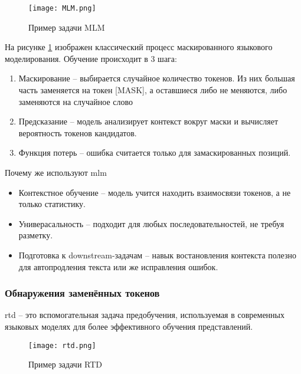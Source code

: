 \documentclass[../part_1.tex]{subfiles}
\begin{document}
\begin{figure}[h]
    \centering
    \texttt{[image: MLM.png]}
    \caption{Пример задачи MLM}
    \label{fig:mlm_bert}
\end{figure}
\par На рисунке \ref{fig:mlm_bert} изображен классический процесс маскированного языкового моделирования. Обучение происходит в 3 шага:
\begin{enumerate}
    \item Маскирование -- выбирается случайное количество токенов. Из них большая часть заменяется на токен [MASK], а оставшиеся либо не меняются, либо заменяются на случайное слово
    \item Предсказание -- модель анализирует контекст вокруг маски и вычисляет вероятность токенов кандидатов.
    \item Функция потерь -- ошибка считается только для замаскированных позиций.
\end{enumerate}
\par Почему же используют \acrshort{mlm}
\begin{itemize}
    \item Контекстное обучение -- модель учится находить взаимосвязи токенов, а не только статистику.
    \item Универасальность -- подходит для любых последовательностей, не требуя разметку.
    \item Подготовка к downstream-задачам -- навык востановления контекста полезно для автопродления текста или же исправления ошибок.
\end{itemize}

\subsubsection{Обнаружения заменённых токенов}
\par \acrfull{rtd} -- это вспомогательная задача предобучения, используемая в современных языковых моделях для более эффективного обучения представлений. 

\begin{figure}[h]
    \centering
    \texttt{[image: rtd.png]}
    \caption{Пример задачи RTD}
    \label{fig:rtd_bert}
\end{figure}
\end{document}

